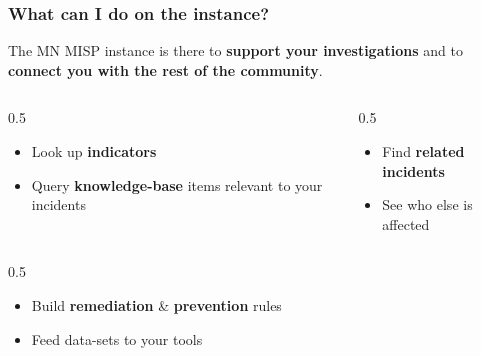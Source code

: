 
\begin{frame}
    \frametitle{What can I do on the instance?}

    The MN MISP instance is there to \textbf{support your investigations} and to
    \textbf{connect you with the rest of the community}.

    \begin{center}
        \begin{columns}[T]
            \begin{column}{0.5\textwidth}
                    {
                        {\setlength{\leftmargini}{1.0em}
                        \begin{itemize}
                            \item Look up \textbf{indicators}
                            \item Query \textbf{knowledge-base} items relevant to your incidents
                        \end{itemize}
                        }
                    }
            \end{column}
            \hfill
            \begin{column}{0.5\textwidth}
                    {
                        {\setlength{\leftmargini}{1.0em}
                        \begin{itemize}
                            \item Find \textbf{related incidents}
                            \item See who else is affected
                        \end{itemize}
                        }
                    }
            \end{column}
        \end{columns}
        \begin{columns}[T]
            \begin{column}{0.5\textwidth}
                    {
                        {\setlength{\leftmargini}{1.0em}
                        \begin{itemize}
                            \item Build \textbf{remediation} \& \textbf{prevention} rules
                            \item Feed data-sets to your tools

\end{itemize}}}
\end{column}
\end{columns}
\end{center}
\end{frame}
